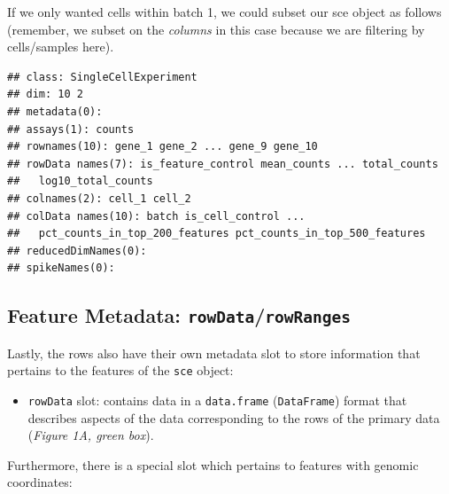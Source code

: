 \documentclass[]{book}
\newenvironment{Shaded}{\begin{snugshade}}{\end{snugshade}}
\newcommand{\CommentTok}[1]{\textcolor[rgb]{0.56,0.35,0.01}{\textit{#1}}}
\newcommand{\DecValTok}[1]{\textcolor[rgb]{0.00,0.00,0.81}{#1}}
\newcommand{\NormalTok}[1]{#1}
\newcommand{\OperatorTok}[1]{\textcolor[rgb]{0.81,0.36,0.00}{\textbf{#1}}}
\newcommand{\StringTok}[1]{\textcolor[rgb]{0.31,0.60,0.02}{#1}}
\providecommand{\tightlist}{%
  \setlength{\itemsep}{0pt}\setlength{\parskip}{0pt}}
\begin{document}
\begin{Shaded}
\end{Shaded}

If we only wanted cells within batch 1, we could subset our sce object as follows (remember, we subset on the \emph{columns} in this case because we are filtering by cells/samples here).

\begin{Shaded}
\end{Shaded}

\begin{verbatim}
## class: SingleCellExperiment 
## dim: 10 2 
## metadata(0):
## assays(1): counts
## rownames(10): gene_1 gene_2 ... gene_9 gene_10
## rowData names(7): is_feature_control mean_counts ... total_counts
##   log10_total_counts
## colnames(2): cell_1 cell_2
## colData names(10): batch is_cell_control ...
##   pct_counts_in_top_200_features pct_counts_in_top_500_features
## reducedDimNames(0):
## spikeNames(0):
\end{verbatim}

\hypertarget{feature-metadata-rowdatarowranges}{%
\subsection{\texorpdfstring{Feature Metadata: \texttt{rowData}/\texttt{rowRanges}}{Feature Metadata: rowData/rowRanges}}\label{feature-metadata-rowdatarowranges}}

Lastly, the rows also have their own metadata slot to store information that pertains to the features of the \texttt{sce} object:

\begin{itemize}
\tightlist
\item
  \texttt{rowData} slot: contains data in a \texttt{data.frame} (\texttt{DataFrame}) format that describes aspects of the data corresponding to the rows of the primary data (\emph{Figure 1A, green box}).
\end{itemize}

Furthermore, there is a special slot which pertains to features with genomic coordinates:
\end{document}
